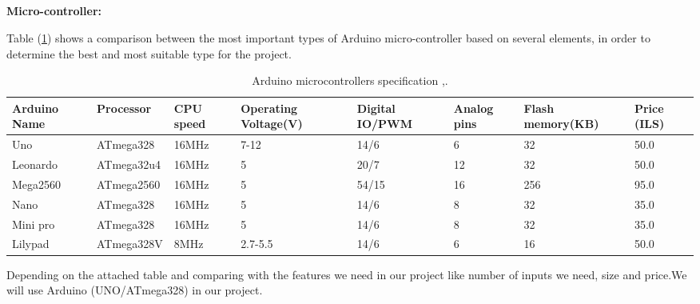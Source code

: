 \documentclass[12pt,a4paper]{report}
\begin{document}
\subsection{\fontsize{12}{12}\selectfont{Hardware Components}}

{ \textbf{Micro-controller:}} 



Table (\ref{tab:micro}) shows a comparison between the most important types of Arduino micro-controller based on several elements, in order to determine the best and most suitable type for the project.

\begin{table}[H]
\begin{center}
\caption{Arduino microcontrollers specification 
\cite{Arduino1},\cite{Arduino2}. }
\label{tab:micro}  
\begin{tabular}{|p{1.7cm}  |p{2.3cm}  |p{1.2cm}  |p{2cm}
|p{1.5cm} |p{1.3cm}  |p{1.4cm}   |p{1cm}|}
\hline
\textbf{Arduino Name} 
& \textbf{Processor}
& \textbf{CPU speed}
& \textbf{Operating Voltage(V)}
& \textbf{Digital IO/PWM}
& \textbf{Analog pins}
& \textbf{Flash memory(KB)}
& \textbf{Price
(ILS)} \\ 

\hline

\textcolor{bb}{Uno}	& \textcolor{bb}{ATmega328} 
 & \textcolor{bb}{16MHz}  & \textcolor{bb}{7-12}	
  & \textcolor{bb}{14/6}	&\textcolor{bb}{6}	
   &\textcolor{bb}{32} &\textcolor{bb}{50.0} \\\hline

Leonardo &ATmega32u4 &16MHz	&5	&20/7	&12	&32	&50.0 \\\hline

Mega2560 	&ATmega2560	&16MHz	&5	&54/15	&16	&256	 &95.0\\\hline

Nano	 &ATmega328	&16MHz	&5	&14/6	&8	&32	&35.0\\\hline

Mini pro	 &ATmega328	&16MHz	&5	&14/6	&8	&32	&35.0 \\\hline

Lilypad	&ATmega328V	&8MHz	&2.7-5.5 	&14/6	&6	&16	&50.0\\\hline

\end{tabular}
\end{center}  
\end{table}

Depending on the attached table and comparing with the features we need in our project like number of inputs we need, size and price.We will use Arduino (UNO/ATmega328) in our project.\\
\end{document}
